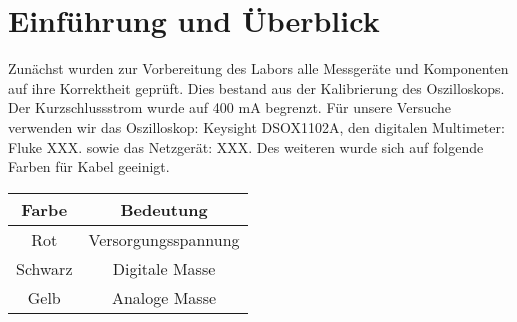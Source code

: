 \chapter{Einführung und Überblick}
Zunächst wurden zur Vorbereitung des Labors alle Messgeräte und Komponenten auf ihre Korrektheit geprüft.
Dies bestand aus der Kalibrierung des Oszilloskops. 
Der Kurzschlussstrom wurde auf 400 mA begrenzt.\newline
Für unsere Versuche verwenden wir das Oszilloskop: Keysight DSOX1102A, \newline
den digitalen Multimeter: Fluke XXX.\newline
sowie das Netzgerät: XXX.\newline \newline
Des weiteren wurde sich auf folgende Farben für Kabel geeinigt.

\begin{tabular}[h]{c|c}
    Farbe & Bedeutung\\
    \hline
    Rot & Versorgungsspannung \\
    \hline
    Schwarz & Digitale Masse \\
    \hline
    Gelb & Analoge Masse 
        \label{tab:Farbenzuordnung}
   \end{tabular}

